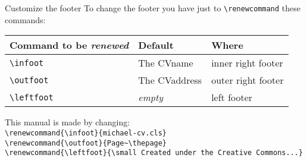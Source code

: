 \documentclass[english]{michael-cv}
\begin{document}
\begin{para}{Customize the footer}
To change the footer you have just to \verb+\renewcommand+ these commands:\\[1ex]
\begin{tabular}{lll}
\toprule
Command to be \emph{renewed}	& Default	& Where	\\
\midrule
\verb+\infoot+			& The CVname	& inner right footer		\\
\verb+\outfoot+			& The CVaddress	& outer right footer			\\
\verb+\leftfoot+		& \emph{empty}	& left footer	\\
\bottomrule
\end{tabular}

\vspace{1ex}
This manual is made by changing:\\
\null\hspace{4ex}\verb+\renewcommand{\infoot}{michael-cv.cls}+\\[-2ex]
\null\hspace{4ex}\verb+\renewcommand{\outfoot}{Page~\thepage}+\\[-2ex]
\null\hspace{4ex}\verb+\renewcommand{\leftfoot}{\small Created under the Creative Commons...}+\\[1ex]
\end{para}
\end{document}
